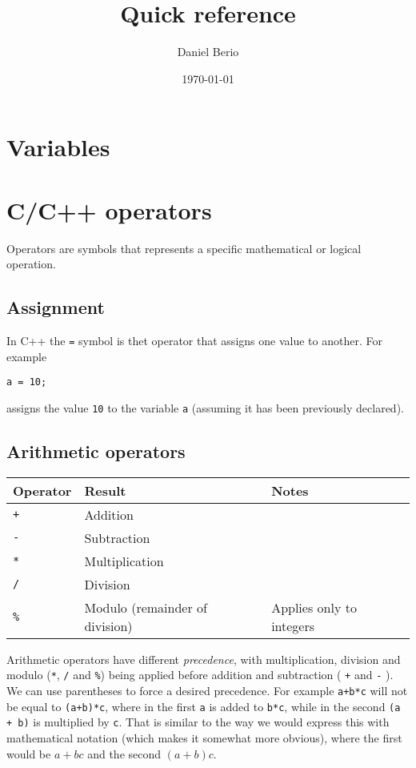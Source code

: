 \documentclass[11pt]{article}
\author{Daniel Berio}
\date{\today}
\title{Quick reference}
\begin{document}
\maketitle
\tableofcontents


\section{Variables}
\label{sec:org4b12230}


\section{C/C++ operators}
\label{sec:org2b4507b}
Operators are symbols that represents a specific mathematical or logical operation.

\subsection{Assignment}
\label{sec:org65c2459}
In C++ the \texttt{=} symbol is thet operator that assigns one value to another. For example
\begin{verbatim}
a = 10;
\end{verbatim}
assigns the value \texttt{10} to the variable \texttt{a} (assuming it has been previously declared).

\subsection{Arithmetic operators}
\label{sec:org1f24b34}
\begin{center}
\begin{tabular}{lll}
Operator & Result & Notes\\[0pt]
\hline
\texttt{+} & Addition & \\[0pt]
\texttt{-} & Subtraction & \\[0pt]
\texttt{*} & Multiplication & \\[0pt]
\texttt{/} & Division & \\[0pt]
\texttt{\%} & Modulo (remainder of division) & Applies only to integers\\[0pt]
\hline
\end{tabular}
\end{center}

Arithmetic operators have different \emph{precedence}, with multiplication, division and modulo (\texttt{*}, \texttt{/} and \texttt{\%}) being applied before addition and subtraction ( \texttt{+} and \texttt{-} ). We can use parentheses to force a desired precedence. For example \texttt{a+b*c} will not be equal to \texttt{(a+b)*c}, where in the first \texttt{a} is added to \texttt{b*c}, while in the second \texttt{(a + b)} is multiplied by \texttt{c}. That is similar to the way we would express this with mathematical notation (which makes it somewhat more obvious), where the first would be \(a + bc\) and the second \((a + b)c\).
\end{document}
